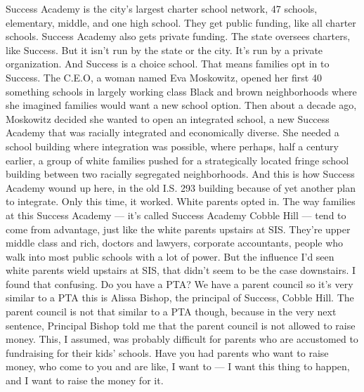 Success Academy is the city's largest charter school network, 47
schools, elementary, middle, and one high school. They get public
funding, like all charter schools. Success Academy also gets private
funding. The state oversees charters, like Success. But it isn't run by
the state or the city. It's run by a private organization. And Success
is a choice school. That means families opt in to Success. The C.E.O, a
woman named Eva Moskowitz, opened her first 40 something schools in
largely working class Black and brown neighborhoods where she imagined
families would want a new school option. Then about a decade ago,
Moskowitz decided she wanted to open an integrated school, a new Success
Academy that was racially integrated and economically diverse. She
needed a school building where integration was possible, where perhaps,
half a century earlier, a group of white families pushed for a
strategically located fringe school building between two racially
segregated neighborhoods. And this is how Success Academy wound up here,
in the old I.S. 293 building because of yet another plan to integrate.
Only this time, it worked. White parents opted in. The way families at
this Success Academy --- it's called Success Academy Cobble Hill ---
tend to come from advantage, just like the white parents upstairs at
SIS. They're upper middle class and rich, doctors and lawyers, corporate
accountants, people who walk into most public schools with a lot of
power. But the influence I'd seen white parents wield upstairs at SIS,
that didn't seem to be the case downstairs. I found that confusing. Do
you have a PTA? We have a parent council so it's very similar to a PTA
this is Alissa Bishop, the principal of Success, Cobble Hill. The parent
council is not that similar to a PTA though, because in the very next
sentence, Principal Bishop told me that the parent council is not
allowed to raise money. This, I assumed, was probably difficult for
parents who are accustomed to fundraising for their kids' schools. Have
you had parents who want to raise money, who come to you and are like, I
want to --- I want this thing to happen, and I want to raise the money
for it.

